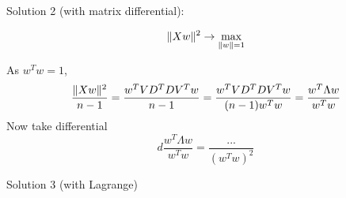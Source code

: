 \documentclass[12pt]{article}
\DeclarePairedDelimiter{\norm}{\lVert}{\rVert}
\begin{document}
Solution 2 (with matrix differential):

\[
\norm{Xw}^2  \to \max_{\norm{w} = 1}
\]

As $w^Tw = 1$,
\[
    \frac{\norm{Xw}^2}{n - 1} = \frac{w^T VD^T DV^T w}{n-1} = \frac{w^T VD^T DV^T w }{ (n - 1)w^Tw }   = \frac{w^T \Lambda w}{ w^T w}
\]
Now take differential 
\[
d \frac{w^T \Lambda w}{ w^T w} = \frac{...}{ (w^T w)^2}
\]

Solution 3 (with Lagrange)
\end{document}
